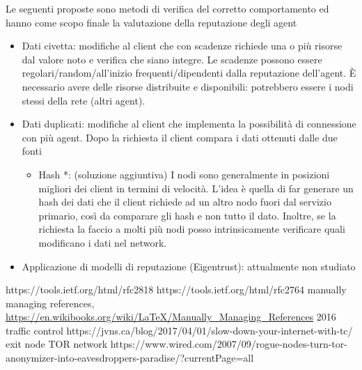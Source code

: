 \documentclass[]{article}
\begin{document}
	Le seguenti proposte sono metodi di verifica del corretto comportamento ed hanno come scopo finale la valutazione della reputazione degli agent
	\begin{itemize}
		\item Dati civetta: modifiche al client che con scadenze richiede una o più risorse dal valore noto e verifica che siano integre. Le scadenze possono essere regolari/random/all’inizio frequenti/dipendenti dalla reputazione dell’agent. È necessario avere delle risorse distribuite e disponibili: potrebbero essere i nodi stessi della rete (altri agent).
		\item Dati duplicati: modifiche al client che implementa la possibilità di connessione con più agent. Dopo la richiesta il client compara i dati ottenuti dalle due fonti
		\begin{itemize}
			\item Hash *: (soluzione aggiuntiva) I nodi sono generalmente in posizioni migliori dei client in termini di velocità. L’idea è quella di far generare un hash dei dati che il client richiede ad un altro nodo fuori dal servizio primario, così da comparare gli hash e non tutto il dato.
			Inoltre, se la richiesta la faccio a molti più nodi posso intrinsicamente verificare quali modificano i dati nel network.
		\end{itemize}
		\item Applicazione di modelli di reputazione (Eigentrust): attualmente non studiato
	\end{itemize}

	
	\begin{thebibliography}{1}
			https://tools.ietf.org/html/rfc2818
			https://tools.ietf.org/html/rfc2764
			manually managing references, 
			\url{https://en.wikibooks.org/wiki/LaTeX/Manually_Managing_References}
			2016
			traffic control
			https://jvns.ca/blog/2017/04/01/slow-down-your-internet-with-tc/
			exit node TOR network
			https://www.wired.com/2007/09/rogue-nodes-turn-tor-anonymizer-into-eavesdroppers-paradise/?currentPage=all

	\end{thebibliography}
		
	\pagebreak
	
	
\end{document}
